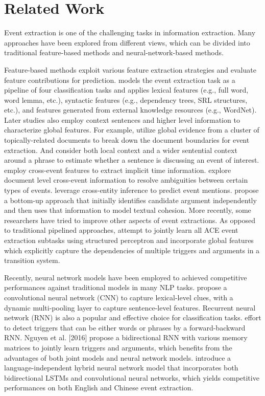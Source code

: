 \section{Related Work}\label{related}
Event extraction is one of the challenging tasks in information extraction. Many approaches have been explored from different views, which can be divided into  traditional feature-based methods and neural-network-based methods.

Feature-based methods exploit various feature extraction strategies and evaluate feature contributions for prediction.  models the event extraction task as a pipeline of four classification tasks and applies lexical features (e.g., full word, word lemma, etc.), syntactic features (e.g., dependency trees, SRL structures, etc.), and  features generated from external knowledge resources (e.g., WordNet). Later studies also employ context  sentences and higher level information to characterize global features. For example,  utilize global evidence from a cluster of topically-related documents to break down the document boundaries for event extraction. And  consider both local context and a wider sentential context around a phrase  to estimate whether a sentence is discussing an event of interest.  employ cross-event features to extract implicit time information.  explore document level cross-event information to resolve ambiguities between certain types of events.  leverage cross-entity inference to predict event mentions.    propose a bottom-up approach that initially identifies candidate argument independently and then uses that information to model textual cohesion. More recently, some researchers have tried to improve other aspects of event extractions. As opposed to traditional pipelined approaches,  attempt to jointly learn all ACE event extraction subtasks using structured perceptron and incorporate global features which explicitly capture the dependencies of multiple triggers and arguments in a transition system.

Recently, neural network models have been employed to achieved competitive performances against traditional models in many NLP tasks.  propose a convolutional neural network (CNN) to capture lexical-level clues, with a dynamic multi-pooling layer to capture sentence-level features. Recurrent neural network (RNN) is also a popular and effective choice for classification tasks.  effort to detect triggers that can be either words or phrases by a forward-backward RNN. Nguyen et al. [2016] propose a bidirectional RNN with various memory matrices to jointly learn triggers and arguments, which benefits from the advantages of both joint models and neural network models.  introduce a language-independent hybrid neural network model that incorporates both bidirectional LSTMs and convolutional neural networks, which yields competitive performances on both English and Chinese event extraction.


